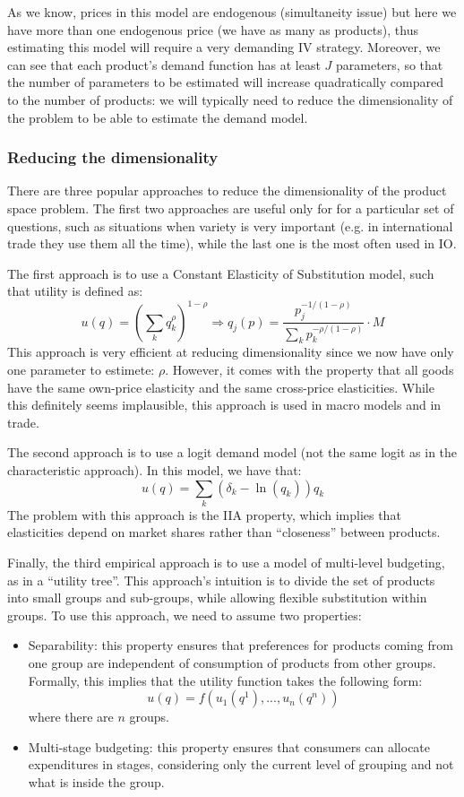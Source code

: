 As we know, prices in this model are endogenous (simultaneity issue) but here we have more than one endogenous price (we have as many as products), thus estimating this model will require a very demanding IV strategy. Moreover, we can see that each product's demand function has at least $J$ parameters, so that the number of parameters to be estimated will increase quadratically compared to the number of products: we will typically need to reduce the dimensionality of the problem to be able to estimate the demand model.

\subsubsection{Reducing the dimensionality}

There are three popular approaches to reduce the dimensionality of the product space problem. The first two approaches are useful only for for a particular set of questions, such as situations when variety is very important (e.g. in international trade they use them all the time), while the last one is the most often used in IO.

The first approach is to use a Constant Elasticity of Substitution model, such that utility is defined as: $$ u(q) = \left(\sum_k q_k^\rho\right)^{1-\rho} \Rightarrow q_j(p) = \frac{p_j^{-1/(1-\rho)}}{\sum_k p_k^{-\rho/(1-\rho)}} \cdot M $$
This approach is very efficient at reducing dimensionality since we now have only one parameter to estimete: $\rho$. However, it comes with the property that all goods have the same own-price elasticity and the same cross-price elasticities. While this definitely seems implausible, this approach is used in macro models and in trade.

The second approach is to use a logit demand model (not the same logit as in the characteristic approach). In this model, we have that: $$ u(q) = \sum_k (\delta_k - \ln(q_k))q_k $$ The problem with this approach is the IIA property, which implies that elasticities depend on market shares rather than ``closeness'' between products.

Finally, the third empirical approach is to use a model of multi-level budgeting, as in a ``utility tree''. This approach's intuition is to divide the set of products into small groups and sub-groups, while allowing flexible substitution within groups. To use this approach, we need to assume two properties:\begin{itemize}
\item Separability: this property ensures that preferences for products coming from one group are independent of consumption of products from other groups. Formally, this implies that the utility function takes the following form: $$ u(q) = f(u_1(q^1), ..., u_n(q^n)) $$ where there are $n$ groups.
\item Multi-stage budgeting: this property ensures that consumers can allocate expenditures in stages, considering only the current level of grouping and not what is inside the group.
\end{itemize}

